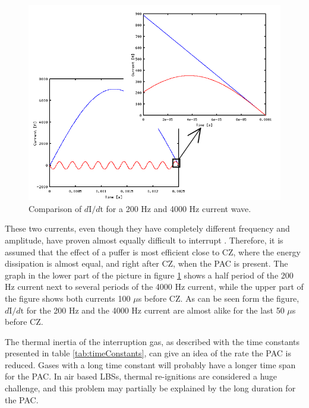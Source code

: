 \documentclass[10pt,b5paper,twoside]{article}
\begin{document}
\begin{figure} [H]
\centering
\includegraphics[scale=0.6]{Bilder/Theory/diffFreq3.png}
\caption{Comparison of $d \mathrm{I}/d \mathrm{t}$ for a 200 Hz and 4000 Hz current wave.} \label{fig:freqComp}
\end{figure}

These two currents, even though they have completely different frequency and amplitude, have proven almost equally difficult to interrupt \cite{bib:CIHVN}. Therefore, it is assumed that the effect of a puffer is most efficient close to CZ, where the energy dissipation is almost equal, and right after CZ, when the PAC is present. The graph in the lower part of the picture in figure \ref{fig:freqComp} shows a half period of the 200 Hz current next to several periods of the 4000 Hz current, while the upper part of the figure shows both currents 100 $\mu$s before CZ. As can be seen form the figure, $d \mathrm{I}/d \mathrm{t}$ for the 200 Hz and the 4000 Hz current are almost alike for the last 50 $\mu$s before CZ.

The thermal inertia of the interruption gas, as described with the time constants presented in table \ref{tab:timeConstants}, can give an idea of the rate the PAC is reduced. Gases with a long time constant will probably have a longer time span for the PAC. In air based LBSs, thermal re-ignitions are considered a huge challenge, and this problem may partially be explained by the long duration for the PAC.
\end{document}
